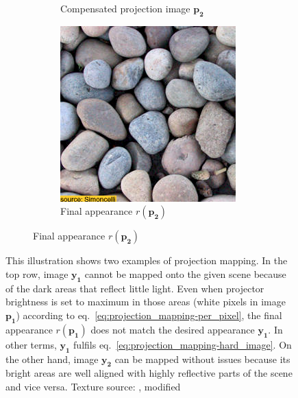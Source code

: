 \begin{figure}[ht]
\begin{subfigure}{\textwidth}
\begin{subfigure}{0.2\textwidth}
            \caption*{Compensated projection image \(\bm{p_2}\)}
            \label{fig:intro_pixels_vs_stats-stats_opt}
        \end{subfigure}
        \hfill
        \begin{subfigure}{0.2\textwidth}
            \centering
            \includegraphics[width=\textwidth]{images/01-pixels_vs_stats-stats_proj.jpg}
            \caption*{Final appearance \(r(\bm{p_2})\)}
            \label{fig:intro_pixels_vs_stats-stats_proj}
        \end{subfigure}
    \end{subfigure}
    \caption{This illustration shows two examples of projection mapping. In the top row, image \(\bm{y_1}\) cannot be mapped onto the given scene because of the dark areas that reflect little light. Even when projector brightness is set to maximum in those areas (white pixels in image \(\bm{p_1}\)) according to eq.~\ref{eq:projection_mapping-per_pixel}, the final appearance \(r(\bm{p_1})\) does not match the desired appearance \(\bm{y_1}\). In other terms, \(\bm{y_1}\) fulfils eq.~\ref{eq:projection_mapping-hard_image}. On the other hand, image \(\bm{y_2}\) can be mapped without issues because its bright areas are well aligned with highly reflective parts of the scene and vice versa. Texture source: \citet{Gatys2015}, modified}
    \label{fig:intro_pixels_vs_stats}
\end{figure}

